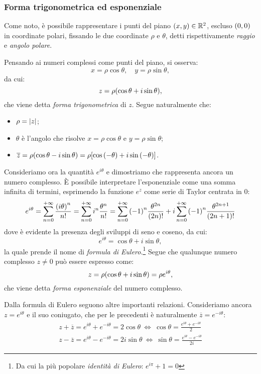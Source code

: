     \subsubsection{Forma trigonometrica ed esponenziale}
        Come noto, \`e possibile rappresentare i punti del piano $\qty(x,y)\in\mathbb{R}^2$, escluso $\qty(0,0)$ in coordinate polari, fissando le due coordinate $\rho$ e $\theta$, detti rispettivamente \emph{raggio} e \emph{angolo polare}. \par Pensando ai numeri complessi come punti del piano, si osserva: $$x=\rho\cos\theta,\quad y=\rho\sin\theta,$$ da cui: $$z=\rho\qty(\cos\theta+i\sin\theta),$$ che viene detta \emph{forma trigonometrica} di $z$. Segue naturalmente che:
        \begin{itemize}
            \item $\rho=\abs{z}$;
            \item $\theta$ \`e l'angolo che risolve $x=\rho\cos\theta$ e $y=\rho\sin\theta$;
            \item $\overline{z}=\rho\qty(\cos\theta-i\sin\theta)=\rho\qty[\cos\qty(-\theta)+i\sin\qty(-\theta)]$.
        \end{itemize}
        \par Consideriamo ora la quantit\`a $e^{i\theta}$ e dimostriamo che rappresenta ancora un numero complesso. \`E possibile interpretare l'esponenziale come una somma infinita di termini, esprimendo la funzione $e^z$ come serie di Taylor centrata in $0$: $$e^{i\theta}=\sum_{n=0}^{+\infty}\frac{\qty(i\theta)^n}{n!}=\sum_{n=0}^{+\infty}i^n\frac{\theta^n}{n!}=\sum_{n=0}^{+\infty}\qty(-1)^n\frac{\theta^{2n}}{\qty(2n)!}+i\sum_{n=0}^{+\infty}\qty(-1)^n\frac{\theta^{2n+1}}{\qty(2n+1)!}$$ dove \`e evidente la presenza degli sviluppi di seno e coseno, da cui: 
        \begin{equation}
            e^{i\theta}=\cos\theta+i\sin\theta,
            \label{eq:euler:1}
        \end{equation}
        la quale prende il nome di \emph{formula di Eulero}.\footnote{Da cui la pi\`u popolare \emph{identit\`a di Eulero}: $e^{i\pi}+1=0$} Segue che qualunque numero complesso $z\neq 0$ pu\`o essere espresso come: $$z=\rho\qty(\cos\theta+i\sin\theta)=\rho e^{i\theta},$$ che viene detta \emph{forma esponenziale} del numero complesso.
        \par Dalla formula di Eulero seguono altre importanti relazioni. Consideriamo ancora $z=e^{i\theta}$ e il suo coniugato, che per le precedenti \`e naturalmente $\overline{z}=e^{-i\theta}$:
        \begin{align}
            z+\overline{z}=e^{i\theta}+e^{-i\theta}=2\cos\theta\ \iff\ \cos\theta=\frac{e^{i\theta}+e^{-i\theta}}{2}\\
            z-\overline{z}=e^{i\theta}-e^{-i\theta}=2i\sin\theta\ \iff\ \sin\theta=\frac{e^{i\theta}-e^{-i\theta}}{2i}
        \end{align}
